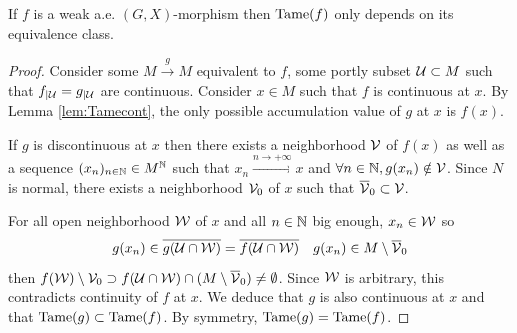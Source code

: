 \begin{lem}\label{lem:Tame_equ} If $f$ is a weak a.e. $(G,X)$-morphism then $\mathrm{Tame}(f)$ only depends on its equivalence class.
\end{lem}
\begin{proof}
 Consider some $M\xrightarrow{g} M$ equivalent to $f$, some portly subset $\mathcal{U}\subset M$ such that $f_{|\mathcal{U}}=g_{|\mathcal{U}}$ are continuous.  Consider $x\in M$ such that $f$ is continuous at $x$. By Lemma \ref{lem:Tamecont}, the only possible accumulation value of $g$ at $x$ is $f(x)$. 
 
 If $g$ is discontinuous at $x$ then there exists a neighborhood $\mathcal V$ of $f(x)$ as well as a sequence $(x_n)_{n\in \mathbb{N}} \in M^{\mathbb{N}}$ such that $x_n\xrightarrow{n\rightarrow +\infty} x$ and $\forall n\in \mathbb{N}, g(x_n)\notin \mathcal V$. Since $N$ is normal, there exists a neighborhood $\mathcal V_0$ of $x$ such that $\overline {\mathcal V}_0 \subset \mathcal V$. 

 For  all open neighborhood $\mathcal W$ of $x$ and all $n\in \mathbb{N}$ big enough,  $x_n\in \mathcal W$ so  $$g(x_n)\in \overline {g(\mathcal{U}\cap \mathcal W )} = \overline{f(\mathcal{U}\cap \mathcal W)} \quad g(x_n) \in M\setminus \overline {\mathcal V}_0$$
then $f(\mathcal W)\setminus \mathcal V_0 \supset f(\mathcal{U}\cap \mathcal W) \cap (M\setminus \overline {\mathcal V}_0) \neq \emptyset$. Since $\mathcal W$ is arbitrary, this contradicts continuity of $f$ at $x$. 
We deduce that $g$ is also continuous at $x$ and that $\mathrm{Tame}(g)\subset \mathrm{Tame}(f)$. 
By symmetry, $\mathrm{Tame}(g)=\mathrm{Tame}(f)$.

 
\end{proof}


